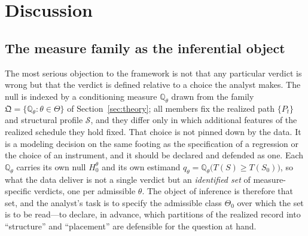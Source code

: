 \section{Discussion}
\label{sec:discussion}


\subsection{The measure family as the inferential object}
\label{sec:discussion-measure}

The most serious objection to the framework is not that any particular verdict is
wrong but that the verdict is defined relative to a choice the analyst makes. The null
is indexed by a conditioning measure $\mathbb{Q}_\theta$ drawn from the family
$\mathfrak{Q}=\{\mathbb{Q}_\theta:\theta\in\Theta\}$ of Section~\ref{sec:theory}; all
members fix the realized path $\{P_t\}$ and structural profile $\mathcal{S}$, and they
differ only in which additional features of the realized schedule they hold fixed. That
choice is not pinned down by the data. It is a modeling decision on the same footing as
the specification of a regression or the choice of an instrument, and it should be
declared and defended as one. Each $\mathbb{Q}_\theta$ carries its own null $H_0^\theta$
and its own estimand $q_\theta=\mathbb{Q}_\theta\big(T(S)\ge T(S_0)\big)$, so what the
data deliver is not a single verdict but an \emph{identified set} of measure-specific
verdicts, one per admissible $\theta$. The object of inference is therefore that set, and
the analyst's task is to specify the admissible class $\Theta_0$ over which the set is to
be read---to declare, in advance, which partitions of the realized record into
``structure'' and ``placement'' are defensible for the question at hand.

